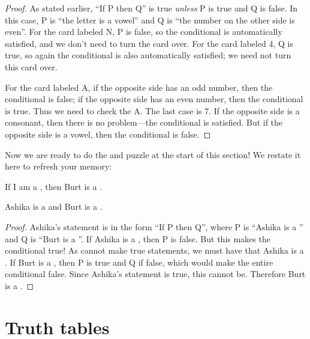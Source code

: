 \documentclass{tufte-book}
\begin{document}
\begin{proof}
  As stated earlier, ``If P then Q'' is true \emph{unless} P is true and Q is false. In this case, P is ``the letter is a vowel'' and Q is ``the number on the other side is even''. For the card labeled N, P is false, so the conditional is automatically satisfied, and we don't need to turn the card over. For the card labeled 4, Q is true, so again the conditional is also automatically satisfied; we need not turn this card over.

  For the card labeled A, if the opposite side has an odd number, then the conditional is false; if the opposite side has an even number, then the conditional is true. Thus we need to check the A. The last case is 7. If the opposite side is a consonant, then there is no problem---the conditional is satisfied. But if the opposite side is a vowel, then the conditional is false.
\end{proof}

Now we are ready to do the \knights and \knaves puzzle at the start of this section! We restate it here to refresh your memory:
  \begin{dialogue}
     If I am a \knight, then Burt is a \knave.
  \end{dialogue}

  \begin{claim}
    Ashika is a \knight and Burt is a \knave.
  \end{claim}

  \begin{proof}
    Ashika's statement is in the form ``If P then Q'', where P is ``Ashika is a \knight'' and Q is ``Burt is a \knave''. If Ashika is a \knave, then P is false. But this makes the conditional true! As \knaves cannot make true statements, we must have that Ashika is a \knight. If Burt is a \knight, then P is true and Q if false, which would make the entire conditional false. Since Ashika's statement is true, this cannot be. Therefore Burt is a \knave.
  \end{proof}


\section{Truth tables}
\label{sec:truth-tables}
\end{document}
